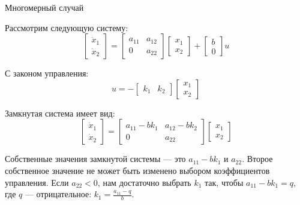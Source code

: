 \documentclass{beamer}
\begin{document}
\begin{frame}{Многомерный случай}
	\begin{flushleft}
		
		Рассмотрим следующую систему:
		\begin{equation}
			\begin{bmatrix}
				\dot x_1 \\ \dot x_2
			\end{bmatrix} 
			= 
			\begin{bmatrix}
				a_{11} & a_{12} \\ 0 & a_{22}
			\end{bmatrix}
			\begin{bmatrix}
				x_1 \\ x_2
			\end{bmatrix} 
			+ 
			\begin{bmatrix}
				b \\ 0
			\end{bmatrix}
			u
		\end{equation}
		
		С законом управления:
		\begin{equation}
			u
			= 
			-
			\begin{bmatrix}
				k_1 & k_2
			\end{bmatrix}
			\begin{bmatrix}
				x_1 \\ x_2
			\end{bmatrix} 
		\end{equation}
		
		Замкнутая система имеет вид:
		\begin{equation}
			\begin{bmatrix}
				\dot x_1 \\ \dot x_2
			\end{bmatrix} 
			= 
			\begin{bmatrix}
				a_{11}-b k_1 & a_{12}-b k_2 \\ 0 & a_{22}
			\end{bmatrix}
			\begin{bmatrix}
				x_1 \\ x_2
			\end{bmatrix} 
		\end{equation}
		
		Собственные значения замкнутой системы — это $a_{11}-b k_1$ и $a_{22}$. Второе собственное значение не может быть изменено выбором коэффициентов управления. Если $a_{22} < 0$, нам достаточно выбрать $k_1$ так, чтобы $a_{11}-b k_1 = q$, где $q$ — отрицательное: $k_1 = \frac{ a_{11} - q}{b}$.
		
	\end{flushleft}
\end{frame}
\end{document}
